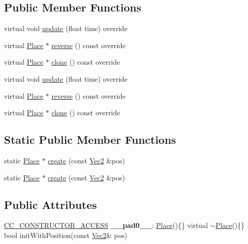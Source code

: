 \subsection*{Public Member Functions}
\begin{DoxyCompactItemize}
\item 
virtual void \hyperlink{classPlace_ac1096e69dd514a74920ae060ab1b671f}{update} (float time) override
\item 
virtual \hyperlink{classPlace}{Place} $\ast$ \hyperlink{classPlace_aea55a3981ebe1aa3ad8fd4cd7bf26337}{reverse} () const override
\item 
virtual \hyperlink{classPlace}{Place} $\ast$ \hyperlink{classPlace_acd8513fc561c66d883d39703b6d5b0d9}{clone} () const override
\item 
virtual void \hyperlink{classPlace_a1ab3900efa596c098e0fb84232050435}{update} (float time) override
\item 
virtual \hyperlink{classPlace}{Place} $\ast$ \hyperlink{classPlace_a73cc4e23e9c1dd0856b99871537986d0}{reverse} () const override
\item 
virtual \hyperlink{classPlace}{Place} $\ast$ \hyperlink{classPlace_a9207d39fa23c9cfbc2bb79127c611af8}{clone} () const override
\end{DoxyCompactItemize}
\subsection*{Static Public Member Functions}
\begin{DoxyCompactItemize}
\item 
static \hyperlink{classPlace}{Place} $\ast$ \hyperlink{classPlace_a95f2da72e9f2cdc96add109fb4027288}{create} (const \hyperlink{classVec2}{Vec2} \&pos)
\item 
static \hyperlink{classPlace}{Place} $\ast$ \hyperlink{classPlace_ac113343dc30a5e1c8ff4a097885334b3}{create} (const \hyperlink{classVec2}{Vec2} \&pos)
\end{DoxyCompactItemize}
\subsection*{Public Attributes}
\begin{DoxyCompactItemize}
\item 
\mbox{\label{classPlace_a7cf9f75d5baf4d0727c453c130e78a60}} 
\hyperlink{_2cocos2d_2cocos_2base_2ccConfig_8h_a25ef1314f97c35a2ed3d029b0ead6da0}{C\+C\+\_\+\+C\+O\+N\+S\+T\+R\+U\+C\+T\+O\+R\+\_\+\+A\+C\+C\+E\+SS} {\bfseries \+\_\+\+\_\+pad0\+\_\+\+\_\+}\+: \hyperlink{classPlace}{Place}()\{\} virtual $\sim$\hyperlink{classPlace}{Place}()\{\} bool init\+With\+Position(const \hyperlink{classVec2}{Vec2}\& pos)
\end{DoxyCompactItemize}
